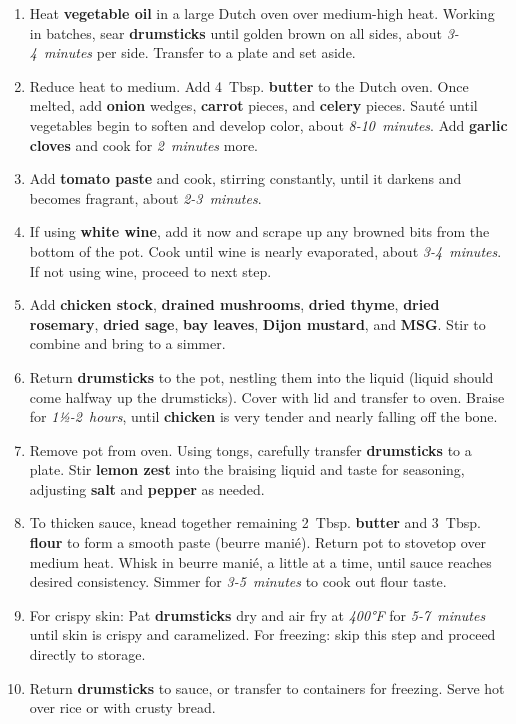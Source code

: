 \documentclass[11pt,letterpaper]{article}
\begin{document}
\begin{enumerate}
    \item Heat \textbf{vegetable oil} in a large Dutch oven over medium-high heat. Working in batches, sear \textbf{drumsticks} until golden brown on all sides, about \textit{3-4~minutes} per side. Transfer to a plate and set aside.
    
    \item Reduce heat to medium. Add 4~Tbsp. \textbf{butter} to the Dutch oven. Once melted, add \textbf{onion} wedges, \textbf{carrot} pieces, and \textbf{celery} pieces. Sauté until vegetables begin to soften and develop color, about \textit{8-10~minutes}. Add \textbf{garlic cloves} and cook for \textit{2~minutes} more.
    
    \item Add \textbf{tomato paste} and cook, stirring constantly, until it darkens and becomes fragrant, about \textit{2-3~minutes}.
    
    \item If using \textbf{white wine}, add it now and scrape up any browned bits from the bottom of the pot. Cook until wine is nearly evaporated, about \textit{3-4~minutes}. If not using wine, proceed to next step.
    
    \item Add \textbf{chicken stock}, \textbf{drained mushrooms}, \textbf{dried thyme}, \textbf{dried rosemary}, \textbf{dried sage}, \textbf{bay leaves}, \textbf{Dijon mustard}, and \textbf{MSG}. Stir to combine and bring to a simmer.
    
    \item Return \textbf{drumsticks} to the pot, nestling them into the liquid (liquid should come halfway up the drumsticks). Cover with lid and transfer to oven. Braise for \textit{1½-2~hours}, until \textbf{chicken} is very tender and nearly falling off the bone.
    
    \item Remove pot from oven. Using tongs, carefully transfer \textbf{drumsticks} to a plate. Stir \textbf{lemon zest} into the braising liquid and taste for seasoning, adjusting \textbf{salt} and \textbf{pepper} as needed.
    
    \item To thicken sauce, knead together remaining 2~Tbsp. \textbf{butter} and 3~Tbsp. \textbf{flour} to form a smooth paste (beurre manié). Return pot to stovetop over medium heat. Whisk in beurre manié, a little at a time, until sauce reaches desired consistency. Simmer for \textit{3-5~minutes} to cook out flour taste.
    
    \item For crispy skin: Pat \textbf{drumsticks} dry and air fry at \textit{400°F} for \textit{5-7~minutes} until skin is crispy and caramelized. For freezing: skip this step and proceed directly to storage.
    
    \item Return \textbf{drumsticks} to sauce, or transfer to containers for freezing. Serve hot over rice or with crusty bread.
\end{enumerate}
\end{document}
